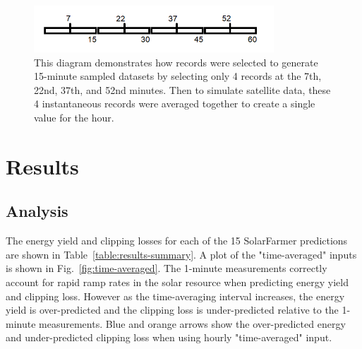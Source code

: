 \documentclass[conference]{IEEEtran}
\begin{document}
\begin{figure}[htbp]
\centerline{\includegraphics[width=9cm]{sampling-diagram.png}}
\caption{This diagram demonstrates how records were selected to generate 15-minute sampled datasets by selecting only 4 records at the 7th, 22nd, 37th, and 52nd minutes. Then to simulate satellite data, these 4 instantaneous records were averaged together to create a single value for the hour.}
\label{fig:sampling-diagram}
\end{figure}

\section{Results}
\label{section:results}

\subsection{Analysis}
The energy yield and clipping losses for each of the 15 SolarFarmer predictions are shown in Table~\ref{table:results-summary}. A plot of the "time-averaged" inputs is shown in Fig.~\ref{fig:time-averaged}. The 1-minute measurements correctly account for rapid ramp rates in the solar resource when predicting energy yield and clipping loss. However as the time-averaging interval increases, the energy yield is over-predicted and the clipping loss is under-predicted relative to the 1-minute measurements. Blue and orange arrows show the over-predicted energy and under-predicted clipping loss when using hourly "time-averaged" input.
\end{document}
